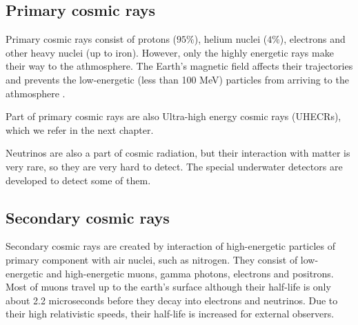 \subsection{Primary cosmic rays}
Primary cosmic rays consist of protons ($95 \%$), helium nuclei ($4 \%$), electrons and other heavy nuclei (up to iron). However, only the highly energetic rays make their way to the athmosphere. The Earth's magnetic field affects their trajectories and prevents the low-energetic (less than 100 MeV) particles from arriving to the athmosphere \cite{Kliewer}. 
\par
Part of primary cosmic rays are also Ultra-high energy cosmic rays (UHECRs), which we refer in the next chapter.
\par 
Neutrinos are also a part of cosmic radiation, but their interaction with matter is very rare, so they are very hard to detect. The special underwater detectors are developed to detect some of them. 
\subsection{Secondary cosmic rays}
Secondary cosmic rays are created by interaction of high-energetic particles of primary component with air nuclei, such as nitrogen. They consist of low-energetic and high-energetic muons, gamma photons, electrons and positrons. Most of muons travel up to the earth's surface although their half-life is only about 2.2 microseconds before they decay into electrons and neutrinos. Due to their high relativistic speeds, their half-life is increased for external observers. 




